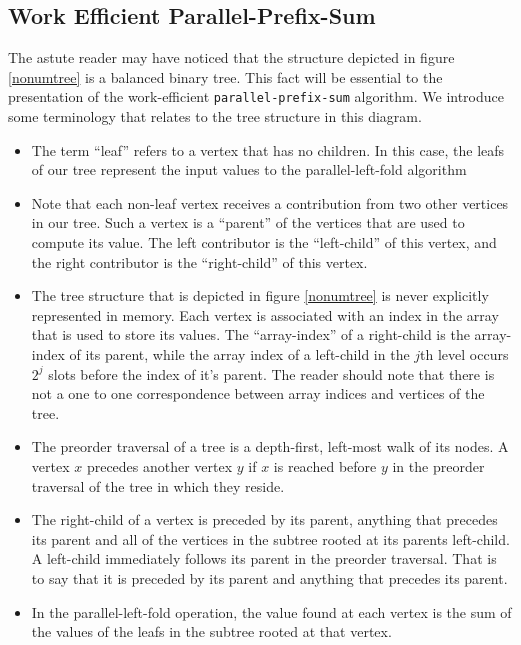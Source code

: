 \documentclass[12pt,twoside]{reedthesis}
\newcommand{\procedure}[1]{{\tt#1}}
\begin{document}
\subsection{Work Efficient Parallel-Prefix-Sum}

The astute reader may have noticed that the structure depicted in figure \ref{nonumtree} is a balanced binary tree. This fact will be essential to the presentation of the work-efficient \procedure{parallel-prefix-sum} algorithm. We introduce some terminology that relates to the tree structure in this diagram.

\begin{itemize}

\item The term ``leaf'' refers to a vertex that has no children. In this case, the leafs of our tree represent the input values to the parallel-left-fold algorithm

\item Note that each non-leaf vertex receives a contribution from two other vertices in our tree. Such a vertex is a ``parent'' of the vertices that are used to compute its value. The left contributor is the ``left-child'' of this vertex, and the right contributor is the ``right-child'' of this vertex.

\item The tree structure that is depicted in figure \ref{nonumtree} is never explicitly represented in memory. Each vertex is associated with an index in the array that is used to store its values. The ``array-index'' of a right-child is the array-index of its parent, while the array index of a left-child in the $j$th level occurs $2^j$ slots before the index of it's parent. The reader should note that there is not a one to one correspondence between array indices and vertices of the tree.

\item The preorder traversal of a tree is a depth-first, left-most walk of its nodes. A vertex $x$ precedes another vertex $y$ if $x$ is reached before $y$ in the preorder traversal of the tree in which they reside.

\item The right-child of a vertex is preceded by its parent, anything that precedes its parent and all of the vertices in the subtree rooted at its parents left-child. A left-child immediately follows its parent in the preorder traversal. That is to say that it is preceded by its parent and anything that precedes its parent.

\item In the parallel-left-fold operation, the value found at each vertex is the sum of the values of the leafs in the subtree rooted at that vertex. 

\end{itemize}
\end{document}
